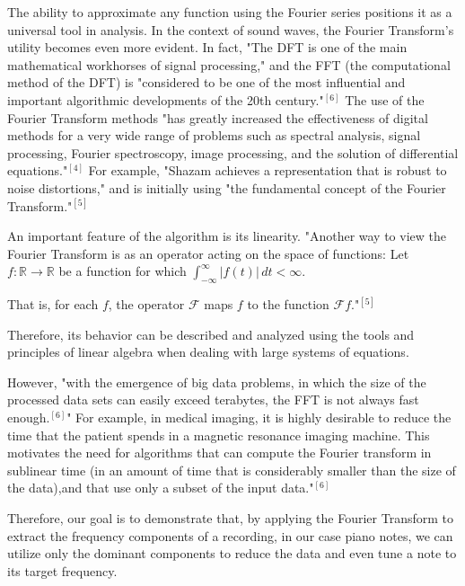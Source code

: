 \documentclass{article}
\begin{document}
The ability to approximate any function using the Fourier series positions it as a universal tool in analysis. In the context of sound waves, the Fourier Transform's utility becomes even more evident. In fact, "The DFT is one of the main mathematical workhorses of signal processing," and the FFT (the computational method of the DFT) is "considered to be one of the most influential and important algorithmic developments of the 20th century."$^{[6]}$ The use of the Fourier Transform methods "has greatly increased the effectiveness of digital methods for a very wide range of problems such as spectral analysis, signal processing, Fourier spectroscopy, image processing, and the solution of differential equations."$^{[4]}$ For example, "Shazam achieves a representation that is robust to noise distortions," and is initially using "the fundamental concept of the Fourier Transform."$^{[5]}$


An important feature of the algorithm is its linearity. "Another way to view the Fourier Transform is as an operator acting on the space of functions: Let $f : \mathbb{R} \to \mathbb{R}$ be a function for which  
$\int_{-\infty}^\infty |f(t)| \, dt < \infty$. 

That is, for each $f$, the operator  $\mathcal{F}$  maps $f$ to the function $\mathcal{F}f$."$^{[5]}$

Therefore, its behavior can be described and analyzed using the tools and principles of linear algebra when dealing with large systems of equations.

However, "with the emergence of big data problems, in which the size of the processed data sets can easily exceed terabytes, the FFT is not always fast enough.$^{[6]}$" For example, in medical imaging, it is highly desirable to reduce the time that the patient spends in a magnetic resonance imaging machine. This motivates the need for algorithms that can compute the Fourier transform in sublinear time (in an amount of time that is considerably smaller than the size of the data),and that use only a subset of the input data."$^{[6]}$

Therefore, our goal is to demonstrate that, by applying the Fourier Transform to extract the frequency components of a recording, in our case piano notes, we can utilize only the dominant components to reduce the data and even tune a note to its target frequency.
\end{document}
